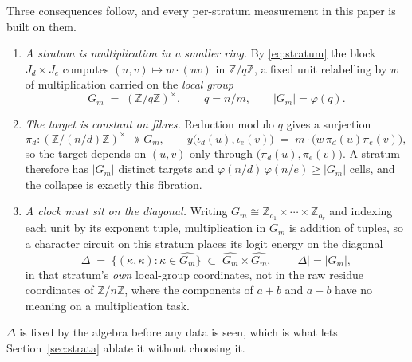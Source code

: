 Three consequences follow, and every per-stratum measurement in this
paper is built on them.

\begin{enumerate}
  \item \emph{A stratum is multiplication in a smaller ring.} By \eqref{eq:stratum} the
    block $J_{d} \times J_{e}$ computes $(u,v) \mapsto w \cdot (uv)$ in
    $\mathbb{Z}/q\mathbb{Z}$, a fixed unit relabelling by $w$ of multiplication carried on the
    \emph{local group}
    \begin{equation}
      \label{eq:localgroup}
      G_{m} \;=\; (\mathbb{Z}/q\mathbb{Z})^{\times}, \qquad q = n/m, \qquad |G_{m}| = \varphi(q).
    \end{equation}
  \item \emph{The target is constant on fibres.} Reduction modulo $q$ gives a surjection
    \begin{equation}
      \label{eq:fibration}
      \pi_{d} : (\mathbb{Z}/(n/d)\mathbb{Z})^{\times} \twoheadrightarrow G_{m},
      \qquad
      y\bigl(\iota_{d}(u), \iota_{e}(v)\bigr) \;=\; m \cdot \bigl(w \, \pi_{d}(u)\pi_{e}(v)\bigr),
    \end{equation}
    so the target depends on $(u,v)$ only through $\bigl(\pi_{d}(u), \pi_{e}(v)\bigr)$. A
    stratum therefore has $|G_{m}|$ distinct targets and $\varphi(n/d)\,\varphi(n/e) \ge
    |G_{m}|$ cells, and the collapse is exactly this fibration.
  \item \emph{A clock must sit on the diagonal.} Writing $G_{m} \cong \mathbb{Z}_{o_{1}}
    \times \cdots \times \mathbb{Z}_{o_{r}}$ and indexing each unit by its exponent tuple,
    multiplication in $G_{m}$ is addition of tuples, so a character circuit on this stratum
    places its logit energy on the diagonal
    \begin{equation}
      \label{eq:diagonal}
      \Delta \;=\; \bigl\{ (\kappa, \kappa) : \kappa \in \widehat{G_{m}} \bigr\}
      \;\subset\; \widehat{G_{m}} \times \widehat{G_{m}},
      \qquad |\Delta| = |G_{m}| ,
    \end{equation}
    in that stratum's \emph{own} local-group coordinates, not in the raw residue
    coordinates of $\mathbb{Z}/n\mathbb{Z}$, where the components of $a+b$ and $a-b$ have no
    meaning on a multiplication task.
\end{enumerate}

$\Delta$ is fixed by the algebra before any data is seen, which is what lets
Section~\ref{sec:strata} ablate it without choosing it.

